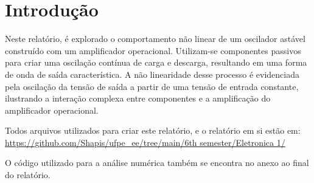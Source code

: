 \section{Introdução}

Neste relatório, é explorado o comportamento não linear de um oscilador astável construído com um amplificador operacional. Utilizam-se componentes passivos para criar uma oscilação contínua de carga e descarga, resultando em uma forma de onda de saída característica. A não linearidade desse processo é evidenciada pela oscilação da tensão de saída a partir de uma tensão de entrada constante, ilustrando a interação complexa entre componentes e a amplificação do amplificador operacional.

Todos arquivos utilizados para criar este relatório, e o relatório em si estão em:  \url{https://github.com/Shapis/ufpe_ee/tree/main/6th semester/Eletronica 1/}

O código utilizado para a análise numérica também se encontra no anexo ao final do relatório.